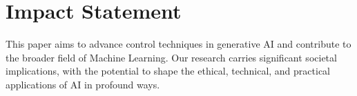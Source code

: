 \newpage
\section*{Impact Statement}This paper aims to advance control techniques in generative AI and contribute to the broader field of Machine Learning. Our research carries significant societal implications, with the potential to shape the ethical, technical, and practical applications of AI in profound ways.
